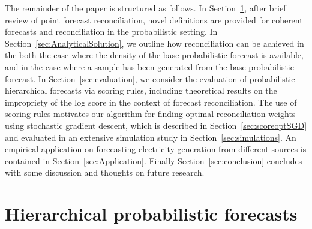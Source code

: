 \documentclass[12pt]{article}
\theoremstyle{definition}
\begin{document}


The remainder of the paper is structured as follows. In Section~\ref{sec:ProbForecasts}, after  brief review of point forecast reconciliation, novel definitions are provided for coherent forecasts and reconciliation in the probabilistic setting. In Section~\ref{sec:AnalyticalSolution}, we outline how reconciliation can be achieved in the both the case where the density of the base probabilistic forecast is available, and in the case where a sample has been generated from the base probabilistic forecast.  In Section~\ref{sec:evaluation}, we consider the evaluation of probabilistic hierarchical forecasts via scoring rules, including theoretical results on the impropriety of the log score in the context of forecast reconciliation.  The use of scoring rules motivates our algorithm for finding optimal reconciliation weights using stochastic gradient descent, which is described in Section~\ref{sec:scoreoptSGD} and evaluated in an extensive simulation study in Section~\ref{sec:simulations}. An empirical application on forecasting electricity generation from different sources is contained in Section~\ref{sec:Application}. Finally Section~\ref{sec:conclusion} concludes with some discussion and thoughts on future research.

\section{Hierarchical probabilistic forecasts}\label{sec:ProbForecasts}
\end{document}
